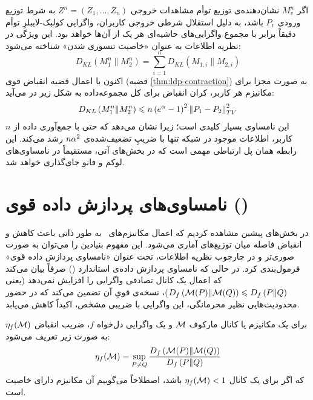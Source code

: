 اگر $M_v^n$ نشان‌دهنده‌ی توزیع توأم مشاهدات خروجی $Z^n = (Z_1, \dots, Z_n)$ به شرط توزیع ورودی $P_v$ باشد، به دلیل استقلال شرطی خروجی کاربران، واگرایی کولبک-لایبلرِ توأم دقیقاً برابر با مجموع واگرایی‌های حاشیه‌ای هر یک از آن‌ها خواهد بود. این ویژگی در نظریه اطلاعات به عنوان «خاصیت تنسوری شدن» شناخته می‌شود:
\begin{equation}
D_{KL}\left(M_1^n \| M_2^n\right) = \sum_{i=1}^n D_{KL}\left(M_{1, i} \| M_{2, i}\right)
\end{equation}
اکنون با اعمال قضیه انقباض قوی (قضیه \ref{thm:ldp-contraction}) به صورت مجزا برای مکانیزم هر کاربر، کران انقباض برای کل مجموعه‌داده به شکل زیر در می‌آید:
\begin{equation}
D_{KL}\left(M_1^n \| M_2^n\right) \leqslant n \left(e^{\alpha} - 1\right)^2 \left\lVert P_1 - P_2\right\rVert_{TV}^2
\end{equation}
این نامساوی بسیار کلیدی است؛ زیرا نشان می‌دهد که حتی با جمع‌آوری داده از $n$ کاربر، اطلاعات موجود در شبکه تنها با ضریبِ تضعیف‌شده‌ی $n\alpha^2$ رشد می‌کند. این رابطه همان پل ارتباطی مهمی است که در بخش‌های آتی، مستقیماً در نامساوی‌های لوکم و فانو جای‌گذاری خواهد شد.
\section{نامساوی‌های پردازش داده قوی ()}
\label{sec:sdpi}



در بخش‌های پیشین مشاهده کردیم که اعمال مکانیزم‌های \LDP\ به طور ذاتی باعث کاهش و انقباض فاصله میان توزیع‌های آماری می‌شود. این مفهوم بنیادین را می‌توان به صورت صوری‌تر و در چارچوب نظریه اطلاعات، تحت عنوان «نامساوی پردازش داده قوی» فرمول‌بندی کرد. در حالی که نامساوی پردازش داده‌ی استاندارد () صرفاً بیان می‌کند که اعمال یک کانال تصادفی واگرایی را افزایش نمی‌دهد (یعنی $D_f\left(\mech(P) \| \mech(Q)\right) \lee D_f\left(P \| Q\right)$)، نسخه‌ی قویِ آن تضمین می‌کند که در حضور محدودیت‌هایی نظیر محرمانگی، این واگرایی با ضریبی مشخص، اکیداً کاهش می‌یابد.

\begin{تعریف}
برای یک مکانیزم یا کانال مارکوف $\mech$ و یک واگرایی دل‌خواه $f$، ضریب انقباض $\eta_f(\mech)$ به صورت زیر تعریف می‌شود:
\begin{equation}
\label{eq:contraction-coeff}
\eta_f(\mech) = \sup_{P \neq Q} \frac{D_f\left(\mech(P) \| \mech(Q)\right)}{D_f\left(P \| Q\right)}
\end{equation}
که اگر برای یک کانال $\eta_f(\mech) < 1$ باشد، اصطلاحاً می‌گوییم آن مکانیزم دارای خاصیت  است.
\end{تعریف}

